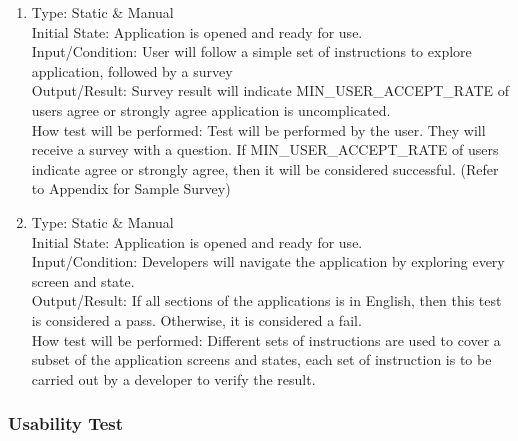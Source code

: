 \documentclass[12pt, titlepage]{article}
\begin{document}
\begin{adjustwidth}{2.2em}{0pt}
\begin{enumerate}[{NF-AT}1.]
    \item Type: Static \& Manual \\
    Initial State: Application is opened and ready for use.\\
    Input/Condition: User will follow a simple set of instructions to explore application, followed by a survey\\
    Output/Result: Survey result will indicate MIN\_USER\_ACCEPT\_RATE of users agree or strongly agree application is uncomplicated. \\
    How test will be performed: Test will be performed by the user. They will receive a survey with a question. If MIN\_USER\_ACCEPT\_RATE of users indicate agree or strongly agree, then it will be considered successful. (Refer to Appendix for Sample Survey)
    
    \item Type: Static \& Manual\\
    Initial State: Application is opened and ready for use.\\
    Input/Condition: Developers will navigate the application by exploring every screen and state.\\
    Output/Result: If all sections of the applications is in English, then this test is considered a pass. Otherwise, it is considered a fail.\\
    How test will be performed: Different sets of instructions are used to cover a subset of the application screens and states, each set of instruction is to be carried out by a developer to verify the result. 
  \end{enumerate}
\end{adjustwidth}

\subsubsection{Usability Test}
\end{document}

